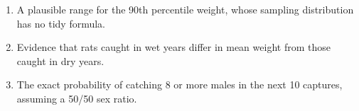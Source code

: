 \documentclass{article}
\newcommand{\blankline}[1]{\underline{\hspace{#1}}}
\begin{document}
\begin{enumerate}[label={\bfseries (\Alph*)},itemsep=.8em]
\item A plausible range for the 90th percentile weight, whose sampling distribution has no tidy formula. \hfill \blankline{.5in} \\[1.5em]
\item Evidence that rats caught in wet years differ in mean weight from those caught in dry years. \hfill \blankline{.5in} \\[1.5em]
\item The exact probability of catching 8 or more males in the next 10 captures, assuming a 50/50 sex ratio. \hfill \blankline{.5in} \\[1.5em]
\end{enumerate}
\end{document}
